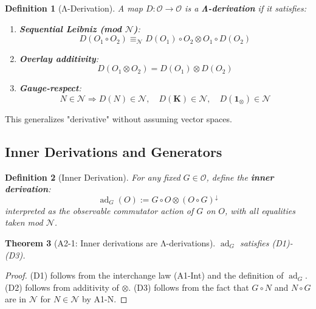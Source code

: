 \documentclass[12pt, oneside]{article}
\newtheorem{theorem}{Theorem}[section]
\newtheorem{definition}[theorem]{Definition}
\DeclareMathOperator{\ad}{ad}
\newcommand{\K}{\mathbf{K}}
\newcommand{\N}{\mathcal{N}}
\newcommand{\Opr}{\mathcal{O}}
\begin{document}
\begin{definition}[Λ-Derivation]
A map $D: \Opr \rightarrow \Opr$ is a \textbf{Λ-derivation} if it satisfies:
\begin{enumerate}[label=(D\arabic*)]
    \item \textbf{Sequential Leibniz (mod $\N$)}:
    \begin{equation}
    D(O_1 \circ O_2) \equiv_\N D(O_1) \circ O_2 \otimes O_1 \circ D(O_2)
    \end{equation}
    
    \item \textbf{Overlay additivity}:
    \begin{equation}
    D(O_1 \otimes O_2) = D(O_1) \otimes D(O_2)
    \end{equation}
    
    \item \textbf{Gauge-respect}:
    \begin{equation}
    N \in \N \Rightarrow D(N) \in \N,\quad D(\K) \in \N,\quad D(\mathbf{1}_\otimes) \in \N
    \end{equation}
\end{enumerate}
\end{definition}

This generalizes "derivative" without assuming vector spaces.

\subsection{Inner Derivations and Generators}

\begin{definition}[Inner Derivation]
For any fixed $G \in \Opr$, define the \textbf{inner derivation}:
\begin{equation}
\ad_G(O) := G \circ O \otimes (O \circ G)^{\downarrow}
\end{equation}
interpreted as the observable commutator action of $G$ on $O$, with all equalities taken mod $\N$.
\end{definition}

\begin{theorem}[A2-1: Inner derivations are Λ-derivations]
$\ad_G$ satisfies (D1)-(D3).
\end{theorem}

\begin{proof}
(D1) follows from the interchange law (A1-Int) and the definition of $\ad_G$. (D2) follows from additivity of $\otimes$. (D3) follows from the fact that $G \circ N$ and $N \circ G$ are in $\N$ for $N \in \N$ by A1-N.
\end{proof}
\end{document}
